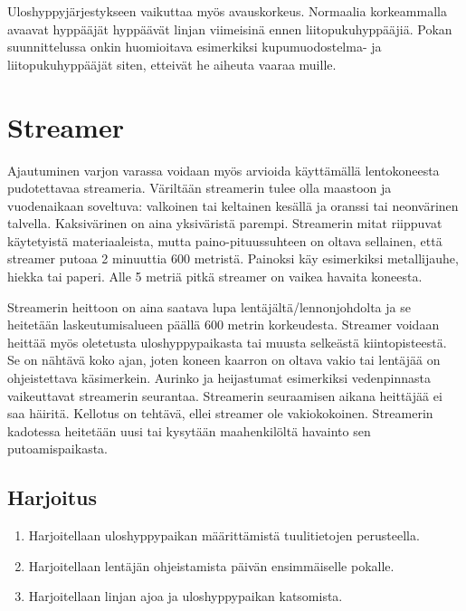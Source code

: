 Uloshyppyjärjestykseen vaikuttaa myös avauskorkeus. Normaalia korkeammalla avaavat hyppääjät hyppäävät linjan viimeisinä ennen liitopukuhyppääjiä. Pokan suunnittelussa onkin huomioitava esimerkiksi kupumuodostelma- ja liitopukuhyppääjät siten, etteivät he aiheuta vaaraa muille. 

\section{ Streamer }
\label{uloshyppypaikan-maaritys-streamer}


Ajautuminen varjon varassa voidaan myös arvioida käyttämällä lentokoneesta pudotettavaa streameria. Väriltään streamerin tulee olla maastoon ja vuodenaikaan soveltuva: valkoinen tai keltainen kesällä ja oranssi tai neonvärinen talvella. Kaksivärinen on aina yksiväristä parempi. Streamerin mitat riippuvat käytetyistä materiaaleista, mutta paino-pituussuhteen on oltava sellainen, että streamer putoaa 2 minuuttia 600 metristä. Painoksi käy esimerkiksi metallijauhe, hiekka tai paperi. Alle 5 metriä pitkä streamer on vaikea havaita koneesta.  


Streamerin heittoon on aina saatava lupa lentäjältä/lennonjohdolta ja se heitetään laskeutumisalueen päällä 600 metrin korkeudesta. Streamer voidaan heittää myös oletetusta uloshyppypaikasta tai muusta selkeästä kiintopisteestä. Se on nähtävä koko ajan, joten koneen kaarron on oltava vakio tai lentäjää on ohjeistettava käsimerkein. Aurinko ja heijastumat esimerkiksi vedenpinnasta vaikeuttavat streamerin seurantaa. Streamerin seuraamisen aikana heittäjää ei saa häiritä. Kellotus on tehtävä, ellei streamer ole vakiokokoinen. Streamerin kadotessa heitetään uusi tai kysytään maahenkilöltä havainto sen putoamispaikasta.  

\subsection{ Harjoitus }
\label{uloshyppypaikan-maaritys-harjoitus}

\begin{enumerate}[label=\bfseries \arabic*)]
\item  Harjoitellaan uloshyppypaikan määrittämistä tuulitietojen perusteella. 
\item  Harjoitellaan lentäjän ohjeistamista päivän ensimmäiselle pokalle. 
\item  Harjoitellaan linjan ajoa ja uloshyppypaikan katsomista. 
\end{enumerate}
